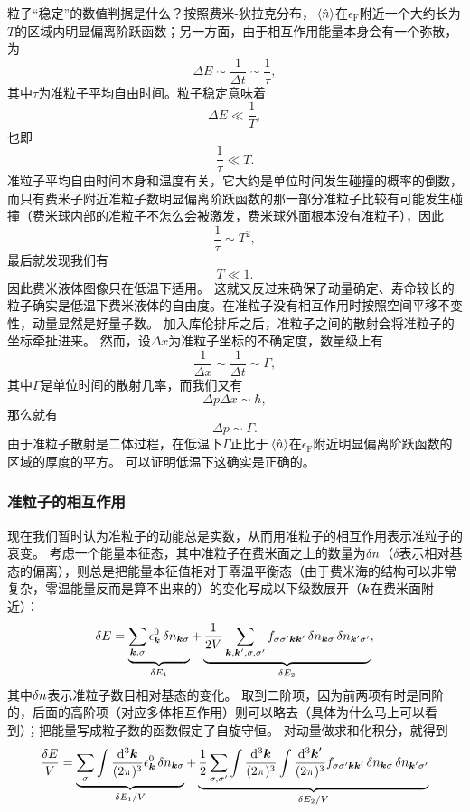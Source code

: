 \documentclass[hyperref, UTF8, a4paper]{ctexart}
\begin{document}
粒子“稳定”的数值判据是什么？按照费米-狄拉克分布，$\expval*{\hat{n}}$在$\epsilon_\text{F}$附近一个大约长为$T$的区域内明显偏离阶跃函数；另一方面，由于相互作用能量本身会有一个弥散，为
\[
    \Delta E \sim \frac{1}{\Delta t} \sim \frac{1}{\tau},
\]
其中$\tau$为准粒子平均自由时间。粒子稳定意味着
\[
    \Delta E \ll \frac{1}{T},
\]
也即
\[
    \frac{1}{\tau} \ll T.
\]
准粒子平均自由时间本身和温度有关，它大约是单位时间发生碰撞的概率的倒数，而只有费米子附近准粒子数明显偏离阶跃函数的那一部分准粒子比较有可能发生碰撞（费米球内部的准粒子不怎么会被激发，费米球外面根本没有准粒子），因此
\[
    \frac{1}{\tau} \sim T^2,
\]
最后就发现我们有
\[
    T \ll 1.
\]
因此费米液体图像只在低温下适用。
这就又反过来确保了动量确定、寿命较长的粒子确实是低温下费米液体的自由度。在准粒子没有相互作用时按照空间平移不变性，动量显然是好量子数。
加入库伦排斥之后，准粒子之间的散射会将准粒子的坐标牵扯进来。
然而，设$\Delta x$为准粒子坐标的不确定度，数量级上有
\[
    \frac{1}{\Delta x} \sim \frac{1}{\Delta t} \sim \Gamma,
\]
其中$\Gamma$是单位时间的散射几率，而我们又有
\[
    \Delta p \Delta x \sim \hbar,
\]
那么就有
\[
    \Delta p \sim \Gamma.
\]
由于准粒子散射是二体过程，在低温下$\Gamma$正比于$\expval*{\hat{n}}$在$\epsilon_\text{F}$附近明显偏离阶跃函数的区域的厚度的平方。
可以证明低温下这确实是正确的。

\subsubsection{准粒子的相互作用}

现在我们暂时认为准粒子的动能总是实数，从而用准粒子的相互作用表示准粒子的衰变。
考虑一个能量本征态，其中准粒子在费米面之上的数量为$\var{n}$（$\delta$表示相对基态的偏离），则总是把能量本征值相对于零温平衡态（由于费米海的结构可以非常复杂，零温能量反而是算不出来的）的变化写成以下级数展开（$\vb*{k}$在费米面附近）：
\begin{equation}
    \var{E} = \underbrace{\sum_{\vb*{k}, \sigma} \epsilon^0_{\vb*{k}} \var{n_{\vb*{k} \sigma}}}_{\var{E_1}} + \underbrace{\frac{1}{2V} \sum_{\vb*{k}, \vb*{k}', \sigma, \sigma'} f_{\sigma \sigma' \vb*{k} \vb*{k}'} \var{n_{\vb*{k} \sigma}} \var{n_{\vb*{k}' \sigma'}}}_{\var{E_2}},
    \label{eq:fermi-liquid-energy}
\end{equation}
其中$\var{n}$表示准粒子数目相对基态的变化。
取到二阶项，因为前两项有时是同阶的，后面的高阶项（对应多体相互作用）则可以略去（具体为什么马上可以看到）；把能量写成粒子数的函数假定了自旋守恒。
对动量做求和化积分，就得到
\begin{equation}
    \frac{\var{E}}{V} = \underbrace{\sum_{\sigma} \int \frac{\dd[3]{\vb*{k}}}{(2\pi)^3} \epsilon^0_{\vb*{k}} \var{n_{\vb*{k} \sigma}}}_{\var{E_1} / V} + \underbrace{\frac{1}{2} \sum_{\sigma, \sigma'} \int \frac{\dd[3]{\vb*{k}}}{(2\pi)^3} \int \frac{\dd[3]{\vb*{k}'}}{(2\pi)^3} f_{\sigma \sigma' \vb*{k} \vb*{k}'} \var{n_{\vb*{k} \sigma}} \var{n_{\vb*{k}' \sigma'}}}_{\var{E_2} / V}
\end{equation}
\end{document}
